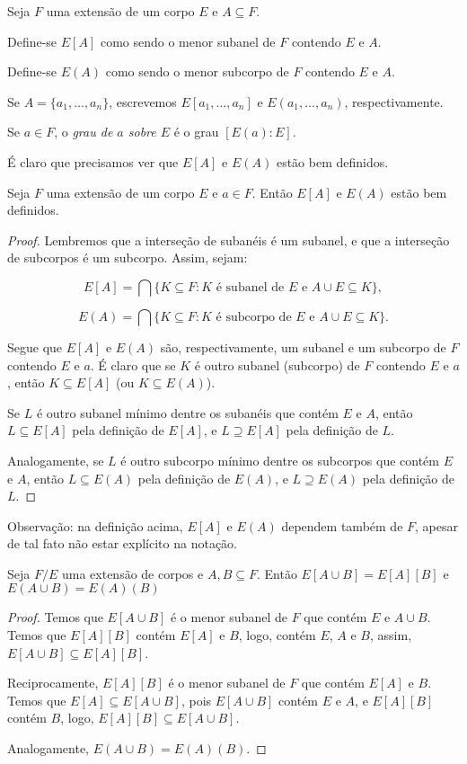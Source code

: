 \begin{definition}
    Seja $F$ uma extensão de um corpo $E$ e $A \subseteq F$.

    Define-se $E[A]$ como sendo o menor subanel de $F$ contendo $E$ e $A$.

    Define-se $E(A)$ como sendo o menor subcorpo de $F$ contendo $E$ e $A$.

    Se $A=\{a_1, \dots, a_n\}$, escrevemos $E[a_1, \dots, a_n]$ e $E(a_1, \dots, a_n)$, respectivamente.

    Se $a \in F$, o \emph{grau de $a$ sobre $E$} é o grau $[E(a):E]$.
\end{definition}

É claro que precisamos ver que $E[A]$ e $E(A)$ estão bem definidos.

\begin{lemma}
    Seja $F$ uma extensão de um corpo $E$ e $a \in F$. Então $E[A]$ e $E(A)$ estão bem definidos.
\end{lemma}

\begin{proof}
    Lembremos que a interseção de subanéis é um subanel, e que a interseção de subcorpos é um subcorpo. Assim, sejam:

    \[E[A]=\bigcap\{K\subseteq F: K \text{ é subanel de } E \text{ e } A\cup E\subseteq K\},\]

    \[E(A)=\bigcap\{K\subseteq F: K \text{ é subcorpo de } E \text{ e } A\cup E\subseteq K\}.\]

    Segue que $E[A]$ e $E(A)$ são, respectivamente, um subanel e um subcorpo de $F$ contendo $E$ e $a$.
    É claro que se $K$ é outro subanel (subcorpo) de $F$ contendo $E$ e $a$, então $K\subseteq E[A]$ (ou $K\subseteq E(A)$). 

    Se $L$ é outro subanel mínimo dentre os subanéis que contém $E$ e $A$, então $L\subseteq E[A]$ pela definição de $E[A]$, e $L\supseteq E[A]$ pela definição de $L$.

    Analogamente, se $L$ é outro subcorpo mínimo dentre os subcorpos que contém $E$ e $A$, então $L\subseteq E(A)$ pela definição de $E(A)$, e $L\supseteq E(A)$ pela definição de $L$.
\end{proof}
Observação: na definição acima, $E[A]$ e $E(A)$ dependem também de $F$, apesar de tal fato não estar explícito na notação.
\begin{lemma}
Seja $F/E$ uma extensão de corpos e $A, B \subseteq F$. Então $E[A\cup B]=E[A][B]$ e $E(A\cup B)=E(A)(B)$
\end{lemma}
\begin{proof}
    Temos que $E[A\cup B]$ é o menor subanel de $F$ que contém $E$ e $A\cup B$. Temos que $E[A][B]$ contém $E[A]$ e $B$, logo, contém $E$, $A$ e $B$, assim, $E[A\cup B]\subseteq E[A][B]$.

    Reciprocamente, $E[A][B]$ é o menor subanel de $F$ que contém $E[A]$ e $B$. Temos que $E[A]\subseteq E[A\cup B]$, pois $E[A\cup B]$ contém $E$ e $A$, e $E[A][B]$ contém $B$, logo, $E[A][B]\subseteq E[A\cup B]$.

    Analogamente, $E(A\cup B)=E(A)(B)$.
\end{proof}

